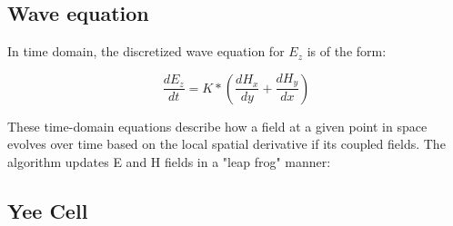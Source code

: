 \subsection{Wave equation}

In time domain, the discretized wave equation for  $ E_z $ is of the form:

$$ 
\frac{{dE_z}}{dt} = K * (\frac{dH_x}{dy} + \frac{dH_y}{dx})
$$



These time-domain equations describe how a field at a given point in space evolves over time based on the local spatial derivative if its coupled fields. The algorithm updates E and H fields in a "leap frog" manner:



\subsection{Yee Cell}


